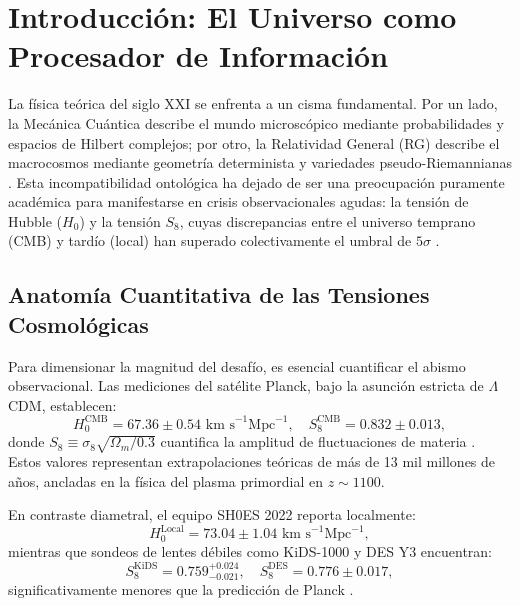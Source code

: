 \documentclass[12pt, a4paper]{article}
\theoremstyle{plain}
\theoremstyle{definition}
\begin{document}
\section{Introducción: El Universo como Procesador de Información}
\label{sec:introduccion}

La física teórica del siglo XXI se enfrenta a un cisma fundamental. Por un lado, 
la Mecánica Cuántica describe el mundo microscópico mediante probabilidades 
y espacios de Hilbert complejos; por otro, la Relatividad General (RG) describe 
el macrocosmos mediante geometría determinista y variedades pseudo-Riemannianas 
\cite{Weinberg1972}. Esta incompatibilidad ontológica ha dejado de ser una 
preocupación puramente académica para manifestarse en crisis observacionales 
agudas: la tensión de Hubble ($H_0$) y la tensión $S_8$, cuyas discrepancias 
entre el universo temprano (CMB) y tardío (local) han superado colectivamente 
el umbral de $5\sigma$ \cite{DiValentino2021, Riess2022, Abdalla2022}.

\subsection{Anatomía Cuantitativa de las Tensiones Cosmológicas}

Para dimensionar la magnitud del desafío, es esencial cuantificar el abismo observacional. 
Las mediciones del satélite Planck, bajo la asunción estricta de $\Lambda$CDM, establecen:
\begin{equation}
    H_0^{\text{CMB}} = 67.36 \pm 0.54 \text{ km s}^{-1} \text{Mpc}^{-1}, \quad
    S_8^{\text{CMB}} = 0.832 \pm 0.013,
    \label{eq:planck_values}
\end{equation}
donde $S_8 \equiv \sigma_8 \sqrt{\Omega_m/0.3}$ cuantifica la amplitud de fluctuaciones 
de materia \cite{Planck2018}. Estos valores representan extrapolaciones teóricas de más 
de 13 mil millones de años, ancladas en la física del plasma primordial en $z \sim 1100$.

En contraste diametral, el equipo SH0ES 2022 reporta localmente:
\begin{equation}
    H_0^{\text{Local}} = 73.04 \pm 1.04 \text{ km s}^{-1} \text{Mpc}^{-1},
    \label{eq:sh0es_value}
\end{equation}
mientras que sondeos de lentes débiles como KiDS-1000 y DES Y3 encuentran:
\begin{equation}
    S_8^{\text{KiDS}} = 0.759^{+0.024}_{-0.021}, \quad
    S_8^{\text{DES}} = 0.776 \pm 0.017,
    \label{eq:lensing_values}
\end{equation}
significativamente menores que la predicción de Planck \cite{KiDS2021, DES2022}.
\end{document}
